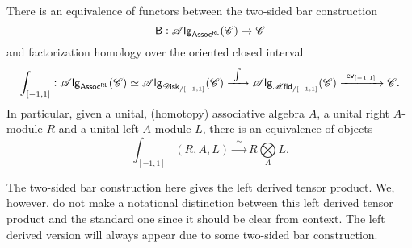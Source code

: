 \documentclass[../text]{subfiles}
\begin{document}
\begin{proposition}\label{prop:barconst=intinterval}
    There is an equivalence of functors between the two-sided bar construction
    \begin{equation}
        \mathsf{B}: \mathscr{A} \mathsf{lg}_{\mathsf{Assoc^{RL}}}(\mathscr{C}) \xrightarrow{} \mathscr{C}
    \end{equation}
    and factorization homology over the oriented closed interval
    \begin{equation}
        \int_{[-1,1]}: \alg{\mathsf{Assoc^{RL}}}(\catC)\simeq \alg{\disk_{/[-1,1]}} (\catC) \xrightarrow{\ \int \ } \alg{\mfld_{/[-1,1]}} (\catC) \xrightarrow{\ \mathsf{ev}_{[-1,1]} \ } \catC.
    \end{equation}
    In particular, given a unital, (homotopy) associative algebra $A$, a unital right $A$-module $R$ and a unital left $A$-module $L$, there is an equivalence of objects
    \begin{equation}
        \int_{[-1,1]} (R, A, L) \xrightarrow{\ \ \simeq \ \ } R \bigotimes\limits_{A} L.
    \end{equation}
\end{proposition}

\begin{remark}
    The two-sided bar construction here gives the left derived tensor product. We, however, do not make a notational distinction between this left derived tensor product and the standard one since it should be clear from context. The left derived version will always appear due to some two-sided bar construction. 
\end{remark}
\end{document}
